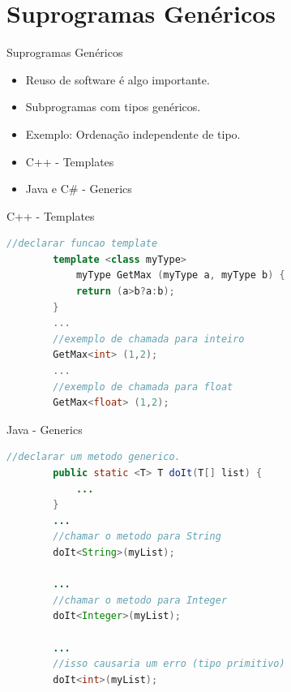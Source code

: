 \section{Suprogramas Genéricos}
\begin{frame}{Suprogramas Genéricos}
	\begin{itemize}
	  \item Reuso de software é algo importante.
	  \item Subprogramas com tipos genéricos.
	  \item Exemplo: Ordenação independente de tipo.
	  \item C++ - Templates
	  \item Java e C\# - Generics
	\end{itemize}
\end{frame}

\begin{frame}[fragile]{C++ - Templates}
	\begin{lstlisting}[language=c++]
		//declarar funcao template
		template <class myType>
			myType GetMax (myType a, myType b) {
			return (a>b?a:b);
		}
		...
		//exemplo de chamada para inteiro
		GetMax<int> (1,2);
		...
		//exemplo de chamada para float
		GetMax<float> (1,2);
	\end{lstlisting}
\end{frame}

\begin{frame}[fragile]{Java - Generics}
	\begin{lstlisting}[language=Java]
		//declarar um metodo generico.
		public static <T> T doIt(T[] list) {
			...
		}
		...
		//chamar o metodo para String
		doIt<String>(myList);
		
		...
		//chamar o metodo para Integer
		doIt<Integer>(myList);
		
		...
		//isso causaria um erro (tipo primitivo)
		doIt<int>(myList);
	\end{lstlisting}
\end{frame}